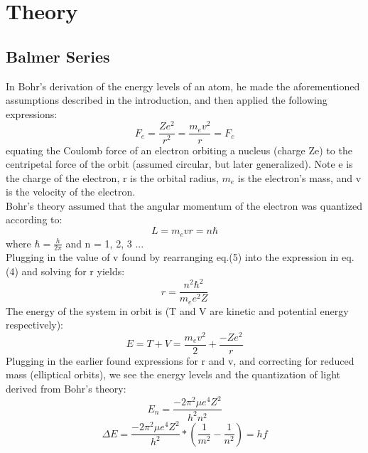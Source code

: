 \documentclass{article}
\begin{document}
\section{Theory}
    \subsection{Balmer Series}
        In Bohr's derivation of the energy levels of an atom, he made the aforementioned assumptions described in the introduction, and then applied the following expressions:
        \begin{equation}
            F_e = \frac{Ze^2}{r^2} = \frac{m_ev^2}{r} = F_c
        \end{equation}
        equating the Coulomb force of an electron orbiting a nucleus (charge Ze) to the centripetal force of the orbit (assumed circular, but later generalized). Note e is the charge of the electron, r is the orbital radius, $m_e$ is the electron's mass, and v is the velocity of the electron.
        \\\indent
        Bohr's theory assumed that the angular momentum of the electron was quantized according to:
        \begin{equation}
            L = m_evr = n\hbar
        \end{equation}
        where $\hbar = \frac{h}{2\pi}$ and n = 1, 2, 3 ...\\\indent Plugging in the value of v found by rearranging eq.(5) into the expression in eq.(4) and solving for r yields:
        \begin{equation}
            r = \frac{n^2\hbar^2}{m_ee^2Z}
        \end{equation}
        The energy of the system in orbit is (T and V are kinetic and potential energy respectively):
        \begin{equation}
            E = T + V = \frac{m_ev^2}{2} + \frac{-Ze^2}{r}
        \end{equation}
        Plugging in the earlier found expressions for r and v, and correcting for reduced mass (elliptical orbits), we see the energy levels and the quantization of light derived from Bohr's theory: 
        \begin{equation}
            E_n = \frac{-2\pi^2\mu e^4 Z^2}{h^2 n^2}
        \end{equation}
        \begin{equation}
            \Delta E = \frac{-2\pi^2\mu e^4 Z^2}{h^2}*(\frac{1}{m^2}-\frac{1}{n^2}) = hf
        \end{equation}
\end{document}
